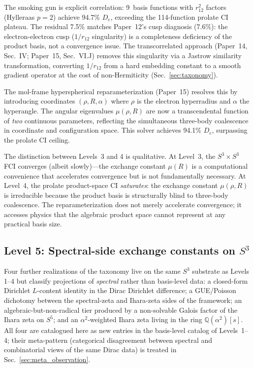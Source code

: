 \documentclass[aps,pra,twocolumn,superscriptaddress,longbibliography]{revtex4-2}
\begin{document}
The smoking gun is explicit correlation: 9~basis functions with
$r_{12}^2$ factors (Hylleraas $p = 2$) achieve 94.7\% $D_e$,
exceeding the 114-function prolate CI plateau.  The residual
7.5\% matches Paper~12's cusp diagnosis (7.6\%): the
electron-electron cusp ($1/r_{12}$ singularity) is a completeness
deficiency of the product basis, not a convergence issue.
The transcorrelated approach (Paper~14, Sec.~IV; Paper~15,
Sec.~VI.J) removes this singularity via a Jastrow similarity
transformation, converting $1/r_{12}$ from a hard embedding
constant to a smooth gradient operator at the cost of
non-Hermiticity (Sec.~\ref{sec:taxonomy}).

The mol-frame hyperspherical reparameterization (Paper~15)
resolves this by introducing coordinates $(\rho, R, \alpha)$
where $\rho$ is the electron hyperradius and $\alpha$ the
hyperangle.  The angular eigenvalues $\mu(\rho, R)$ are now a
transcendental function of \textit{two} continuous parameters,
reflecting the simultaneous three-body coalescence in coordinate
and configuration space.  This solver achieves 94.1\% $D_e$,
surpassing the prolate CI ceiling.

The distinction between Levels~3 and 4 is qualitative.  At
Level~3, the $S^3 \times S^3$ FCI converges (albeit slowly)---the
exchange constant $\mu(R)$ is a computational convenience that
accelerates convergence but is not fundamentally necessary.  At
Level~4, the prolate product-space CI \textit{saturates}: the
exchange constant $\mu(\rho, R)$ is irreducible because the
product basis is structurally blind to three-body coalescence.
The reparameterization does not merely accelerate convergence;
it accesses physics that the algebraic product space cannot
represent at any practical basis size.



\subsection{Level 5: Spectral-side exchange constants on $S^3$}
\label{sec:level5_rh_sprint}

Four further realizations of the taxonomy live on the same $S^3$
substrate as Levels 1--4 but classify projections of \emph{spectral}
rather than basis-level data: a closed-form Dirichlet $L$-content
identity in the Dirac Dirichlet difference; a GUE/Poisson dichotomy
between the spectral-zeta and Ihara-zeta sides of the framework; an
algebraic-but-non-radical tier produced by a non-solvable Galois
factor of the Ihara zeta on $S^5$; and an $\alpha^2$-weighted Ihara
zeta living in the ring $\mathbb{Q}(\alpha^2)[s]$.  All four are
catalogued here as new entries in the basis-level catalog of
Levels~1--4; their meta-pattern (categorical disagreement between
spectral and combinatorial views of the same Dirac data) is treated
in Sec.~\ref{sec:meta_observation}.
\end{document}
